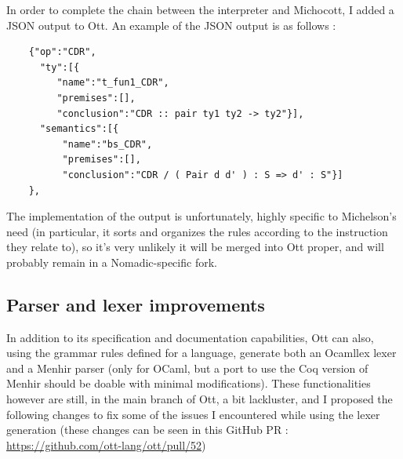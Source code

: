 \documentclass{report}
\begin{document}
In order to complete the chain between the interpreter and Michocott, I added a JSON output to Ott. An example of the JSON output is as follows :
\begin{verbatim}
    {"op":"CDR",
      "ty":[{
         "name":"t_fun1_CDR",
         "premises":[],
         "conclusion":"CDR :: pair ty1 ty2 -> ty2"}],
      "semantics":[{
          "name":"bs_CDR",
          "premises":[],
          "conclusion":"CDR / ( Pair d d' ) : S => d' : S"}]
    },
\end{verbatim}
The implementation of the output is unfortunately, highly specific to Michelson's need (in particular, it sorts and organizes the rules according to the instruction they relate to), so it's very unlikely it will be merged into Ott proper, and will probably remain in a Nomadic-specific fork.

\subsection{Parser and lexer improvements}
\label{parserLexerImprov}
In addition to its specification and documentation capabilities, Ott can also, using the grammar rules defined for a language, generate both an Ocamllex lexer and a Menhir parser (only for OCaml, but a port to use the Coq version of Menhir should be doable with minimal modifications). These functionalities however are still, in the main branch of Ott, a bit lackluster, and I proposed the following changes to fix some of the issues I encountered while using the lexer generation (these changes can be seen in this GitHub PR : \url{https://github.com/ott-lang/ott/pull/52})
\end{document}
